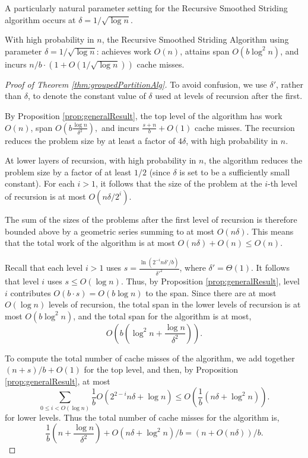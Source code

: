 \documentclass[twoside,leqno,twocolumn]{article}
\begin{document}
A particularly natural parameter setting for the Recursive
Smoothed Striding algorithm occurs at $\delta = 1 / \sqrt{\log n}$.
\begin{corollary}
  \label{cor:groupedPartitionAlg} With high probability in $n$,
  the Recursive Smoothed Striding Algorithm using parameter
  $\delta=1/\sqrt{\log n}$: achieves work $O(n)$, attains span
  $O(b\log^2 n)$, and incurs $n/b \cdot (1 + O(1 / \sqrt{\log
  n}))$ cache misses. 
\end{corollary}

\begin{proof}[Proof of Theorem \ref{thm:groupedPartitionAlg}]
  To avoid confusion, we use $\delta'$, rather than $\delta$, to
  denote the constant value of $\delta$ used at levels of recursion
  after the first.
  
  
  By Proposition \ref{prop:generalResult}, the top level of the algorithm
  has work $O(n)$, span $O\left(b\frac{\log n}{\delta^2}\right),$ and
  incurs $\frac{s+n}{b} + O(1)$ cache misses.  The recursion reduces
  the problem size by at least a factor of $4\delta$, with high
  probability in $n$.

  At lower layers of recursion, with high probability in $n$, the
  algorithm reduces the problem size by a factor of at least
  $1/2$ (since $\delta$ is set to be a sufficiently small
  constant). For each $i > 1$, it follows that the size of the
  problem at the $i$-th level of recursion is at most $O(n \delta
  / 2^i)$.
  
  The sum of the sizes of the problems after the first level of
  recursion is therefore bounded above by a geometric series summing to at most $O(n
  \delta)$. This means that the total work of the algorithm is at most
  $O(n\delta) + O(n) \le O(n)$.

  Recall that each level $i > 1$ uses $s =
  \frac{\ln(2^{-i}n\delta'/b)}{\delta'^2}$, where $\delta' =
  \Theta(1)$. It follows that level $i$ uses $s \le O(\log n)$.
  Thus, by Proposition \ref{prop:generalResult}, level $i$
  contributes $O(b\cdot s)=O(b \log n)$ to the span.  Since there
  are at most  $O(\log n)$ levels of recursion, the total span in
  the lower levels of recursion is at most $O(b\log^2 n)$, and
  the total span for the algorithm is at most,
  $$O\left(b\left(\log^2 n + \frac{\log
  n}{\delta^2}\right)\right).$$
        
  To compute the total number of cache misses of the algorithm,
  we add together $(n+s)/b+O(1)$ for the top level, and then, by
  Proposition \ref{prop:generalResult}, at most $$\sum_{0 \leq i<
    O(\log n)}\frac{1}{b} O\left(2^{2-i}n\delta + \log n\right) \le
  O\left(\frac{1}{b} (n \delta + \log^2 n)\right).$$ for lower
  levels. Thus the total number of cache misses for the algorithm
  is, $$\frac{1}{b}\left(n+\frac{\log n}{\delta^2 }\right) +
  O(n\delta + \log^2 n) / b = (n+O(n\delta))/b.$$ 
\end{proof}
\end{document}
